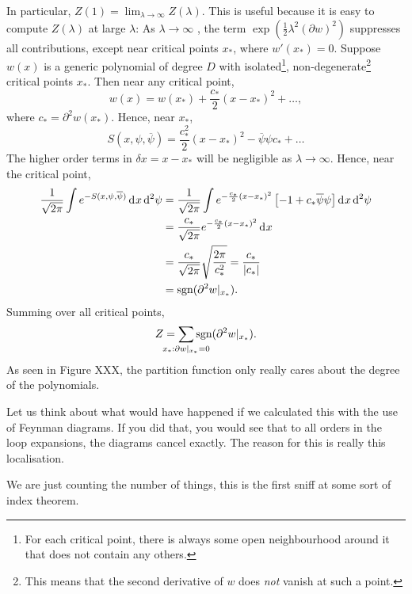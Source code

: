 In particular, $ Z(1) = \lim_{\lambda \to \infty}  Z(\lambda)$. This is useful because it is easy to compute $Z(\lambda)$  at large $\lambda$: As $\lambda \to \infty$ , the term $\exp(\frac{1}{2}\lambda^2 (\partial w)^2)$ suppresses all contributions, except near critical points $x_*$, where $w'(x_*) = 0$.
Suppose $w(x)$ is a generic polynomial of degree $D$ with isolated\footnote{For each critical point, there is always some open neighbourhood around it that does not contain any others.}, non-degenerate\footnote{This means that the second derivative of $w$ does \emph{not} vanish at such a point.} critical points $x_*$.
Then near any critical point, 
\begin{equation}
  w(x) = w(x_*) + \frac{c_*}{2} (x-x_*)^2 + \dots,
\end{equation} 
where $c_* = \partial^2 w(x_*)$.
Hence, near $x_*$,
\begin{equation}
  S(x, \psi, \overline{\psi}) = \frac{c_*^2}{2} (x - x_*)^2 - \overline{\psi}\psi c_* + \dots
\end{equation}
The higher order terms in $\delta x = x - x_*$ will be negligible as $\lambda \to \infty$.
Hence, near the critical point,
\begin{align}
  \frac{1}{\sqrt{2\pi}} \int e^{-S(x, \psi, \overline{\psi})} \dd[]{x} \dd[2]{\psi} &= \frac{1}{\sqrt{2\pi}} \int e^{-\frac{c_*}{2} (x  -x_*)^2} \left[ -1 + c_* \overline{\psi} \psi \right] \dd[]{x} \dd[2]{\psi} \\
										    &= \frac{c_*}{\sqrt{ 2 \pi}} e^{-\frac{c_*}{2} (x - x_*)^2} \dd[]{x} \\
										    &= \frac{c_*}{\sqrt{ 2 \pi}} \sqrt{\frac{2 \pi}{c_*^2}} = \frac{c_*}{\abs{c_*}} \\
										    &= \text{sgn}(\partial^2 w \rvert_{x_*}).
\end{align}
Summing over all critical points, 
\begin{equation}
  Z = \sum_{\mathclap{x_*: \partial w\rvert_{x_*} = 0}} \text{sgn}(\partial^2 w\rvert_{x_*}).
\end{equation}
As seen in Figure XXX, the partition function only really cares about the degree of the polynomials.

Let us think about what would have happened if we calculated this with the use of Feynman diagrams.
If you did that, you would see that to all orders in the loop expansions, the diagrams cancel exactly.
The reason for this is really this localisation.

We are just counting the number of things, this is the first sniff at some sort of index theorem.
